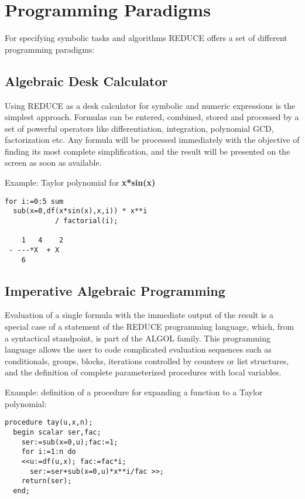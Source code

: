 \section{Programming Paradigms}
 
For specifying symbolic tasks and algorithms {\small REDUCE} offers a set
of different programming paradigms:

 \subsection{Algebraic Desk Calculator}

Using {\small REDUCE} as a desk calculator for symbolic and numeric
expressions is the simplest approach.  Formulas can be entered, combined,
stored and processed by a set of powerful operators like differentiation,
integration, polynomial GCD, factorization etc.  Any formula will be
processed immediately with the objective of finding its most complete
simplification, and the result will be presented on the screen as soon as
available.

Example: Taylor polynomial for {\bf x*sin(x)}

\begin{verbatim}
for i:=0:5 sum 
  sub(x=0,df(x*sin(x),x,i)) * x**i 
            / factorial(i);

    1   4    2
 - ---*X  + X
    6
\end{verbatim}

 
\subsection{Imperative Algebraic Programming}

Evaluation of a single formula with the immediate output of the result is
a special case of a statement of the {\small REDUCE} programming language,
which, from a syntactical standpoint, is part of the ALGOL family.  This
programming language allows the user to code complicated evaluation
sequences such as conditionals, groups, blocks, iterations controlled by
counters or list structures, and the definition of complete parameterized
procedures with local variables.

Example: definition of a procedure for expanding a function to a Taylor
polynomial:

\begin{verbatim}
procedure tay(u,x,n);
  begin scalar ser,fac;  
    ser:=sub(x=0,u);fac:=1; 
    for i:=1:n do 
    <<u:=df(u,x); fac:=fac*i;   
      ser:=ser+sub(x=0,u)*x**i/fac >>;
    return(ser);  
  end;
\end{verbatim}

